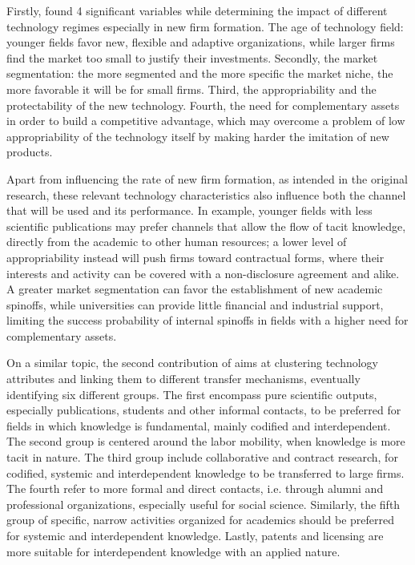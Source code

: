 Firstly, \citet{Shane2001} found 4 significant variables while determining the impact of different technology regimes especially in new firm formation. The age of technology field: younger fields favor new, flexible and adaptive organizations, while larger firms find the market too small to justify their investments. Secondly, the market segmentation: the more segmented and the more specific the market niche, the more favorable it will be for small firms. Third, the appropriability and the protectability of the new technology. Fourth, the need for complementary assets in order to build a competitive advantage, which may overcome a problem of low appropriability of the technology itself by making harder the imitation of new products. 

Apart from influencing the rate of new firm formation, as intended in the original research, these relevant technology characteristics also influence both the channel that will be used and its performance. In example, younger fields with less scientific publications may prefer channels that allow the flow of tacit knowledge, directly from the academic to other human resources; a lower level of appropriability instead will push firms toward contractual forms, where their interests and activity can be covered with a non-disclosure agreement and alike. A greater market segmentation can favor the establishment of new academic spinoffs, while universities can provide little financial and industrial support, limiting the success probability of internal spinoffs in fields with a higher need for complementary assets.

On a similar topic, the second contribution of \citet{Bekkers2008} aims at clustering technology attributes and linking them to different transfer mechanisms, eventually identifying six different groups. The first encompass pure scientific outputs, especially publications, students and other informal contacts, to be preferred for fields in which knowledge is fundamental, mainly codified and interdependent. The second group is centered around the labor mobility, when knowledge is more tacit in nature. The third group include collaborative and contract research, for codified, systemic and interdependent knowledge to be transferred to large firms. The fourth refer to more formal and direct contacts, i.e. through alumni and professional organizations, especially useful for social science. Similarly, the fifth group of specific, narrow activities organized for academics should be preferred for systemic and interdependent knowledge. Lastly, patents and licensing are more suitable for interdependent knowledge with an applied nature. 

